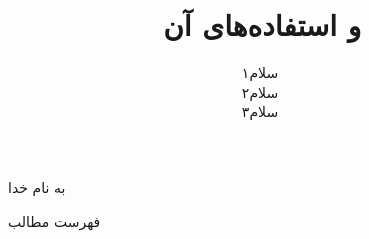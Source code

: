 \documentclass[
    aspectratio=169,
    dvipsnames,
    svgnames,
    x11names
]{beamer}
\title{\lr{\LaTeX}$\,$و استفاده‌های آن}
\author{سلام۱\\سلام۲\\سلام۳}
\institute{
\\\texttt{[image: logos/logo]}\\
دانشگاه‌ اصفهان
}
\date{}
\begin{document}
\begin{frame}[plain]
\begin{center}
به نام خدا
\end{center}
\maketitle
\end{frame}

\setcounter{framenumber}{0}
\raggedleft

\begin{frame}{فهرست مطالب}
\begin{flushright}
\tableofcontents
\end{flushright}
\end{frame}








\end{document}
